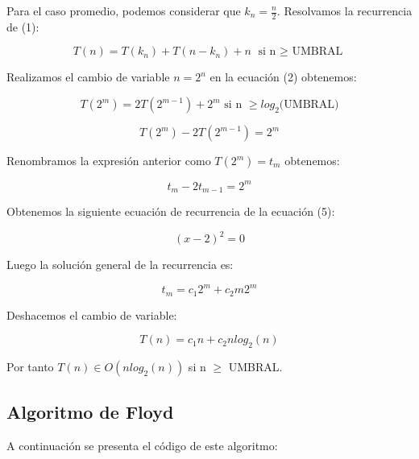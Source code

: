 \documentclass{homework}
\begin{document}
    Para el caso promedio, podemos considerar que $k_{n} = \frac{n}{2}$. Resolvamos la recurrencia de (1):
    
    \begin{equation}
        T(n) = T(k_n) + T(n-k_n) + n \text{ si n $\geq$ UMBRAL}
    \end{equation}

    Realizamos el cambio de variable $n = 2^{n}$ en la ecuación (2) obtenemos:

    \begin{equation}
        T(2^{m}) = 2T(2^{m-1}) + 2^{m} \text{ si n $\geq log_{2}$(UMBRAL)} 
    \end{equation}

    \begin{equation}
        T(2^{m}) - 2T(2^{m-1}) = 2^{m}
    \end{equation}

    Renombramos la expresión anterior como $T(2^{m}) = t_{m}$ obtenemos:

    \begin{equation}
        t_{m} - 2t_{m-1} = 2^{m}
    \end{equation}
    
    Obtenemos la siguiente ecuación de recurrencia de la ecuación (5):

    \begin{equation}
        (x-2)^{2} = 0
    \end{equation}

    Luego la solución general de la recurrencia es:

    \begin{equation}
        t_{m} = c_{1}2^{m} + c_{2}m2^{m}
    \end{equation}

    Deshacemos el cambio de variable:

    \begin{equation}
        T(n) = c_{1}n + c_{2}nlog_{2}(n)
    \end{equation}

    Por tanto $T(n) \in O(nlog_{2}(n))$ si n $\geq$ UMBRAL.
    
    \subsection{Algoritmo de Floyd}

    A continuación se presenta el código de este algoritmo:

    
\end{document}
